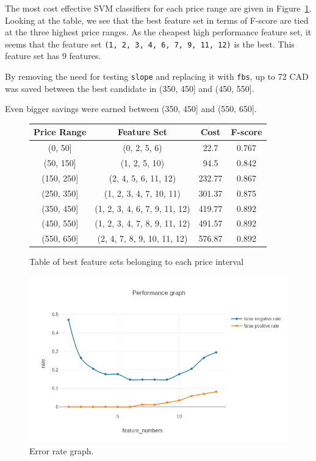 \documentclass[conference]{IEEEtran}
\begin{document}
	The most cost effective SVM classifiers for each price range are given in
	Figure~\ref{fig:cost_effective}. Looking at the table, we see that the 
	best feature set in terms of F-score are tied at the three highest 
	price ranges. As the cheapest high performance feature set, it seems that
	the feature set \texttt{(1, 2, 3, 4, 6, 7, 9, 11, 12)} is the best.
	This feature set has 9 features.

	By removing the need for testing \texttt{slope} and replacing it with \texttt{fbs}, up to 72 CAD was saved between the best candidate in (350, 450] and (450, 550].

	Even bigger savings were earned between (350, 450] and (550, 650].

	\begin{figure}[h]
		\begin{tabular}[h]{|c|c|c|c|}
			\hline
			Price Range & Feature Set & Cost & F-score \\ \hline
			(0, 50] & (0, 2, 5, 6) & 22.7 & 0.767 \\ \hline
			(50, 150] & (1, 2, 5, 10) & 94.5 & 0.842 \\ \hline
			(150, 250] & (2, 4, 5, 6, 11, 12) & 232.77 & 0.867 \\ \hline
			(250, 350] & (1, 2, 3, 4, 7, 10, 11) & 301.37 & 0.875\\ \hline
			(350, 450] & (1, 2, 3, 4, 6, 7, 9, 11, 12) & 419.77 & 0.892 \\ \hline
			(450, 550] & (1, 2, 3, 4, 7, 8, 9, 11, 12) & 491.57 & 0.892 \\ \hline
			(550, 650] & (2, 4, 7, 8, 9, 10, 11, 12) & 576.87 & 0.892 \\ \hline
			\hline
		\end{tabular}
		\centering
		\label{fig:cost_effective}
		\caption{Table of best feature sets belonging to each price interval}
	\end{figure}

	\begin{figure}[h]
		\centering
		\includegraphics{fn_fp_rate.png}
		\caption{Error rate graph.}
		\label{fig:fn_rate}
	\end{figure}
\end{document}
